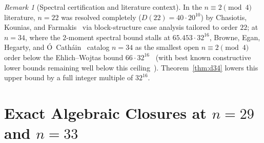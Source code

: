 \documentclass[11pt]{article}
\theoremstyle{remark}
\newtheorem{remark}{Remark}
\begin{document}
\begin{remark}[Spectral certification and literature context]
In the $n \equiv 2 \pmod 4$ literature, $n = 22$ was resolved completely ($D(22) = 40 \cdot 20^{10}$) by Chasiotis, Kounias, and Farmakis~\cite{chasiotis2018,chasiotis2019corr} via block-structure case analysis tailored to order $22$; at $n = 34$, where the $2$-moment spectral bound stalls at $65.453 \cdot 32^{16}$, Browne, Egan, Hegarty, and \'O~Cath\'ain~\cite{browne2021survey} catalog $n = 34$ as the smallest open $n \equiv 2 \pmod 4$ order below the Ehlich--Wojtas bound $66 \cdot 32^{16}$~\cite{ehlich1964a,wojtas1964} (with best known constructive lower bounds remaining well below this ceiling~\cite{koukouvinos2000,orrick2003,brent2012maxdet,brent2013lower,browne2021survey}). Theorem~\ref{thm:d34} lowers this upper bound by a full integer multiple of $32^{16}$.
\end{remark}

\section{Exact Algebraic Closures at \texorpdfstring{$n = 29$ and $n = 33$}{n = 29 and n = 33}}\label{sec:r1}
\end{document}
